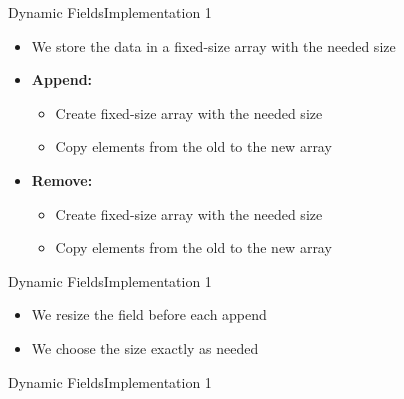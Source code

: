\begin{frame}{Dynamic Fields}{Implementation 1}
  \begin{itemize}
    \item
      We store the data in a fixed-size array with the needed size
    \item
      \textbf{Append:}
      \begin{itemize}
        \item
          Create fixed-size array with the needed size
        \item
          Copy elements from the old to the new array
      \end{itemize}
    \item
      \textbf{Remove:}
      \begin{itemize}
        \item
          Create fixed-size array with the needed size
        \item
          Copy elements from the old to the new array
      \end{itemize}
  \end{itemize}
\end{frame}


\begin{frame}{Dynamic Fields}{Implementation 1}
  \begin{itemize}
    \item
      We resize the field before each append
    \item
      We choose the size exactly as needed
  \end{itemize}
  
\end{frame}


\begin{frame}{Dynamic Fields}{Implementation 1}
  
\end{frame}

